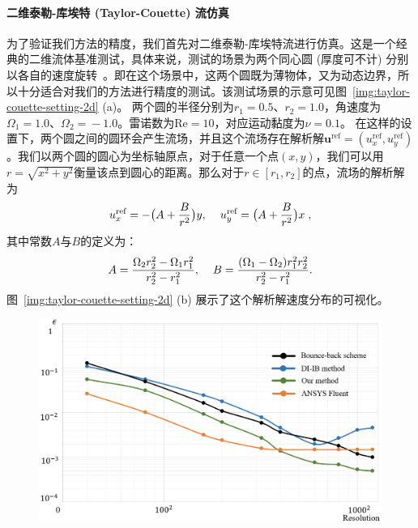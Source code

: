 \paragraph{二维泰勒-库埃特 (Taylor-Couette) 流仿真}
为了验证我们方法的精度，我们首先对二维泰勒-库埃特流进行仿真。这是一个经典的二维流体基准测试，具体来说，测试的场景为两个同心圆 (厚度可不计) 分别以各自的速度旋转~\citep{xu2006immersed}。即在这个场景中，这两个圆既为薄物体，又为动态边界，所以十分适合对我们的方法进行精度的测试。该测试场景的示意可见图~\ref{img:taylor-couette-setting-2d} (a)。
两个圆的半径分别为$r_1 \!=\! 0.5$、$r_2 \!=\! 1.0$，角速度为$\Omega_1 \!=\! 1.0$、$\Omega_2 \!=\! -1.0$。雷诺数为$\text{Re} \!=\! 10$，对应运动黏度为$\nu \!=\! 0.1$。
在这样的设置下，两个圆之间的圆环会产生流场，并且这个流场存在解析解$\bm{u}^\text{ref}\!=\!(u_x^\text{ref},u_y^\text{ref})$。我们以两个圆的圆心为坐标轴原点，对于任意一个点$(x,y)$，我们可以用$r\!=\!\sqrt{x^2+y^2}$衡量该点到圆心的距离。那么对于$r\!\in\![r_1, r_2]$的点，流场的解析解为
\begin{equation}
u_x^\text{ref} = -\bigl(A + \frac{B}{r^2}\bigr)y, \hspace{4mm} u_y^\text{ref} = \bigl(A + \frac{B}{r^2}\bigr)x\;,
\end{equation}
\noindent 其中常数$A$与$B$的定义为：
\begin{equation}
A = \frac{\Omega_2 r_2^2 - \Omega_1 r_1^2}{r_2^2 - r_1^2}, \hspace{4mm} B= \frac{(\Omega_1 - \Omega_2)r_1^2r_2^2}{r_2^2 - r_1^2}.
\end{equation}
图~\ref{img:taylor-couette-setting-2d} (b) 展示了这个解析解速度分布的可视化。

\begin{figure}[!htbp]
  \centering
    \includegraphics[width=0.94\columnwidth]{figures/taylor-couette-error-compare.png}
  \label{img:taylor-couette-error-compare}
\end{figure}

